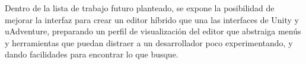 Dentro de la lista de trabajo futuro planteado, se expone la posibilidad de mejorar la interfaz para crear un editor híbrido que una las interfaces de Unity y uAdventure, preparando un perfil de visualización del editor que abstraiga menús y herramientas que puedan distraer a un desarrollador poco experimentando, y dando facilidades para encontrar lo que busque.